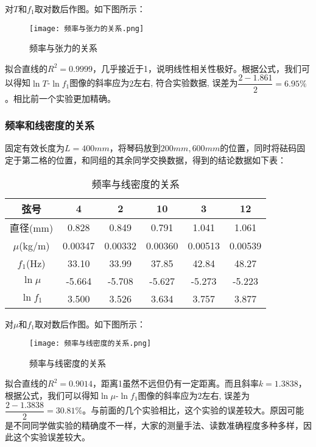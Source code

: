 \documentclass[11pt]{article}
\begin{document}
对$T$和$f_1$取对数后作图。如下图所示：

\begin{figure}[H]
    \centering
    \texttt{[image: 频率与张力的关系.png]}
    \caption{频率与张力的关系}
\end{figure}

拟合直线的$R^2 = 0.9999$，几乎接近于1，说明线性相关性极好。根据公式，我们可以得知$\ln T$-$\ln f_1$图像的斜率应为$2$左右, 符合实验数据, 误差为$\dfrac{2-1.861}{2} = 6.95\%$。相比前一个实验更加精确。

\subsubsection{频率和线密度的关系}

固定有效长度为$L=400mm$，将琴码放到$200mm,600mm$的位置，同时将砝码固定于第二格的位置，和同组的其余同学交换数据，得到的结论数据如下表：

\begin{table}[H]
    \centering
    \caption{频率与线密度的关系}
    \begin{tabular}{|c|c|c|c|c|c|}
        \hline
        弦号&4     & 2     & 10    & 3     & 12 \\
        \hline
        直径(mm)&0.828 & 0.849 & 0.791 & 1.041 & 1.061 \\
        \hline
        $\mu$(kg/m)&0.00347  & 0.00332  & 0.00360  & 0.00513  & 0.00539  \\
        \hline
        $f_1$(Hz)&33.10  & 33.99  & 37.85  & 42.84  & 48.27  \\
        \hline
        $\ln \mu$&-5.664  & -5.708  & -5.627  & -5.273  & -5.223  \\
        \hline
        $\ln f_1$&3.500  & 3.526  & 3.634  & 3.757  & 3.877  \\
        \hline
    \end{tabular}
\end{table}

对$\mu$和$f_1$取对数后作图。如下图所示：

\begin{figure}[H]
    \centering
    \texttt{[image: 频率与线密度的关系.png]}
    \caption{频率与线密度的关系}
\end{figure}

拟合直线的$R^2 = 0.9014$，距离1虽然不远但仍有一定距离。而且斜率$k = 1.3838$，根据公式，我们可以得知$\ln \mu$-$\ln f_1$图像的斜率应为$2$左右, 误差为$\dfrac{2 - 1.3838}{2} = 30.81\%$。与前面的几个实验相比，这个实验的误差较大。原因可能是不同同学做实验的精确度不一样，大家的测量手法、读数准确程度多种多样，因此这个实验误差较大。
\end{document}

